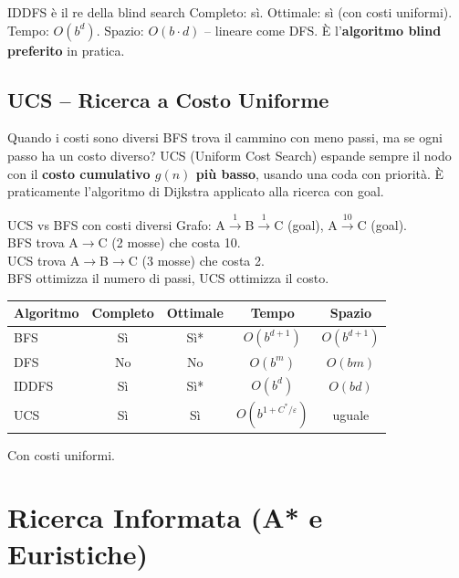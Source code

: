 \documentclass[12pt,a4paper]{article}
\begin{document}
\begin{ricorda}{IDDFS è il re della blind search}
Completo: sì. Ottimale: sì (con costi uniformi). Tempo: $O(b^d)$. Spazio: $O(b \cdot d)$ -- lineare come DFS. È l'\textbf{algoritmo blind preferito} in pratica.
\end{ricorda}

\subsection{UCS -- Ricerca a Costo Uniforme}

\begin{narrativo}{Quando i costi sono diversi}
BFS trova il cammino con meno passi, ma se ogni passo ha un costo diverso? UCS (Uniform Cost Search) espande sempre il nodo con il \textbf{costo cumulativo $g(n)$ più basso}, usando una coda con priorità. È praticamente l'algoritmo di Dijkstra applicato alla ricerca con goal.
\end{narrativo}

\begin{esempio}{UCS vs BFS con costi diversi}
Grafo: A$\xrightarrow{1}$B$\xrightarrow{1}$C (goal), A$\xrightarrow{10}$C (goal).\\
BFS trova A$\to$C (2 mosse) che costa 10.\\
UCS trova A$\to$B$\to$C (3 mosse) che costa 2.\\
BFS ottimizza il numero di passi, UCS ottimizza il costo.
\end{esempio}

\begin{center}
\renewcommand{\arraystretch}{1.3}
\begin{tabular}{lcccc}
\toprule
\textbf{Algoritmo} & \textbf{Completo} & \textbf{Ottimale} & \textbf{Tempo} & \textbf{Spazio} \\
\midrule
BFS & Sì & Sì* & $O(b^{d+1})$ & $O(b^{d+1})$ \\
DFS & No & No & $O(b^m)$ & $O(bm)$ \\
IDDFS & Sì & Sì* & $O(b^d)$ & $O(bd)$ \\
UCS & Sì & Sì & $O(b^{1+C^*/\varepsilon})$ & uguale \\
\bottomrule
\end{tabular}
\end{center}
{\small *Con costi uniformi.}

\section{Ricerca Informata (A* e Euristiche)}
\end{document}
